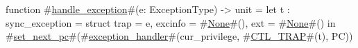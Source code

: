 function #\hyperref[sailRISCVzhandlezyexception]{handle\_exception}#(e: ExceptionType) -> unit = {
  let t : sync_exception = struct { trap    = e,
                                    excinfo = #\hyperref[sailRISCVzNone]{None}#(),
                                    ext     = #\hyperref[sailRISCVzNone]{None}#() } in
  #\hyperref[sailRISCVzsetzynextzypc]{set\_next\_pc}#(#\hyperref[sailRISCVzexceptionzyhandler]{exception\_handler}#(cur_privilege, #\hyperref[sailRISCVzCTLzyTRAP]{CTL\_TRAP}#(t), PC))
}
